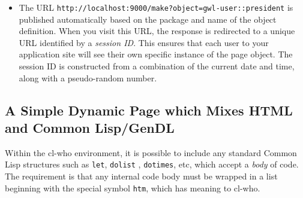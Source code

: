 \documentclass [11pt]{book}
\begin{document}
\begin{itemize}
\item The URL \texttt{http://localhost:9000/make?object=gwl-user::president} is published automatically based on the package and
      name of the object definition. When you visit this URL, the
      response is redirected to a unique URL identified by
      a \emph{session ID}. This ensures that each user to your
      application site will see their own specific instance of the
      page object. The session ID is constructed from a combination of
      the current date and time, along with a pseudo-random
      number.

\end{itemize}





\subsection{A Simple Dynamic Page which Mixes HTML and Common Lisp/GenDL}

\label{subsec:asimpledynamicpagewhichmixeshtmlandcommonlisp/gendl}



Within the cl-who environment, it is possible to include any standard
Common Lisp structures such as \texttt{let}, \texttt{dolist} , \texttt{dotimes}, etc, which accept a \emph{body} of code. The requirement is that any internal code body
	  must be wrapped in a list beginning with the special symbol \texttt{htm}, which has meaning to cl-who. 
\end{document}
